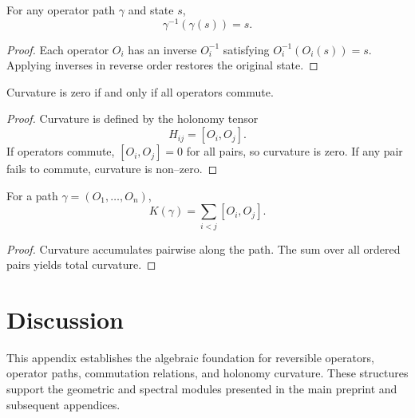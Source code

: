 \begin{theorem}[Reversibility]
For any operator path $\gamma$ and state $s$,
\[
\gamma^{-1}(\gamma(s)) = s.
\]
\end{theorem}

\begin{proof}
Each operator $O_i$ has an inverse $O_i^{-1}$ satisfying
$O_i^{-1}(O_i(s)) = s$. Applying inverses in reverse order restores the
original state.
\end{proof}

\begin{theorem}
Curvature is zero if and only if all operators commute.
\end{theorem}

\begin{proof}
Curvature is defined by the holonomy tensor
\[
H_{ij} = [O_i, O_j].
\]
If operators commute, $[O_i, O_j] = 0$ for all pairs, so curvature is
zero. If any pair fails to commute, curvature is non–zero.
\end{proof}

\begin{theorem}
For a path $\gamma = (O_1, \ldots, O_n)$,
\[
K(\gamma) = \sum_{i < j} [O_i, O_j].
\]
\end{theorem}

\begin{proof}
Curvature accumulates pairwise along the path. The sum over all ordered
pairs yields total curvature.
\end{proof}

\section{Discussion}
This appendix establishes the algebraic foundation for reversible
operators, operator paths, commutation relations, and holonomy curvature.
These structures support the geometric and spectral modules presented in
the main preprint and subsequent appendices.
